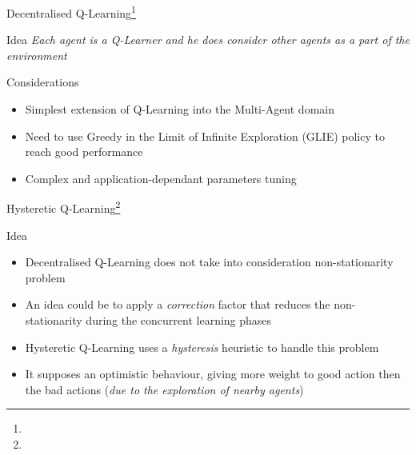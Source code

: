 \documentclass[presentation]{beamer}\mode<presentation>{\usetheme{AMSBolognaFC}}
\begin{document}
\begin{frame}{Decentralised Q-Learning\footnote{}}
	\begin{exampleblock}{Idea}
		\emph{Each agent is a Q-Learner and he does consider other agents as a part of the environment}
	\end{exampleblock}

	\begin{exampleblock}{Considerations}
		\begin{itemize}
			\item[{\color{teal} \faThumbsUp}] Simplest extension of Q-Learning into the Multi-Agent domain
			\item[{\color{red} \faThumbsDown}] Need to use Greedy in the Limit of Infinite Exploration (GLIE) policy to reach good performance
			\item[{\color{red} \faThumbsDown}] Complex and application-dependant parameters tuning
		\end{itemize}
	\end{exampleblock}
\end{frame}

\begin{frame}{Hysteretic Q-Learning\footnote[frame]{}}
	\begin{alertblock}{Idea}
		\begin{itemize}
			\item Decentralised Q-Learning does not take into consideration non-stationarity problem
			\item An idea could be to apply a \emph{correction} factor that reduces the non-stationarity during the concurrent learning phases
			\item Hysteretic Q-Learning uses a \emph{hysteresis} heuristic to handle this problem
			\item It supposes an optimistic behaviour, giving more weight to good action then the bad actions (\emph{due to the exploration of nearby agents})
		\end{itemize}
	\end{alertblock}
\end{frame}
\end{document}
